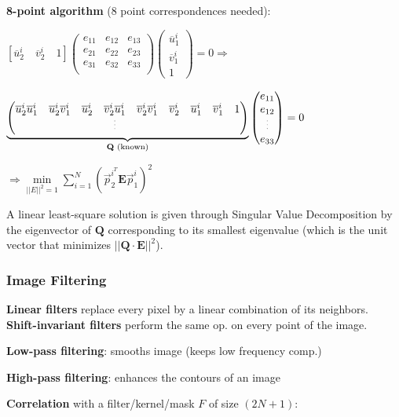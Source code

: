 \documentclass[fontsize=6pt]{scrartcl}
\newcommand{\mat}[1]{\mathbf{#1}}
\begin{document}
\begin{multicols*}{4}
\textbf{8-point algorithm} (8 point correspondences needed):

$
[\overline{u}_2^i \quad \overline{v}_2^i \quad 1]
\left(
\begin{smallmatrix}
e_{11} & e_{12} & e_{13}\\
e_{21} & e_{22} & e_{23}\\
e_{31} & e_{32} & e_{33}\\
\end{smallmatrix}
\right)
\begin{pmatrix}
\overline{u}_1^i \\
\overline{v}_1^i \\
1
\end{pmatrix}
= 0 \Rightarrow$

$
\underbrace{
\begin{pmatrix}
\overline{u}_2^i\overline{u}_1^i & \overline{u}_2^i\overline{v}_1^i & \overline{u}_2^i & \overline{v}_2^i\overline{u}_1^i  & \overline{v}_2^i\overline{v}_1^i & \overline{v}_2^i & \overline{u}_1^i & \overline{v}_1^i & 1\\
&&& \tiny{\vdots} &&&&&
\end{pmatrix}
}_{\mat Q \text{ (known)}}
\begin{pmatrix}
e_{11}\\
e_{12}\\
\tiny{\vdots}\\
e_{33}
\end{pmatrix}
= 0
$

$\Rightarrow \min\limits_{||E||^2=1} \sum\limits_{i=1}^N (\vec p_2^{i^{T}}\mat E \vec p_1^i)^2$

A linear least-square solution is given through Singular Value Decomposition by the eigenvector of $\mat Q$ corresponding to its smallest eigenvalue (which is the unit vector that minimizes $||\mat Q \cdot \mat E||^2$).

\subsubsection*{Image Filtering}

\textbf{Linear filters} replace every pixel by a linear combination of its neighbors. \textbf{Shift-invariant filters} perform the same op. on every point of the image.

\textbf{Low-pass filtering}: smooths image (keeps low frequency comp.)

\textbf{High-pass filtering}: enhances  the contours of an image

\textbf{Correlation} with a filter/kernel/mask $F$ of size $(2N+1)$:


\end{multicols*}
\end{document}
